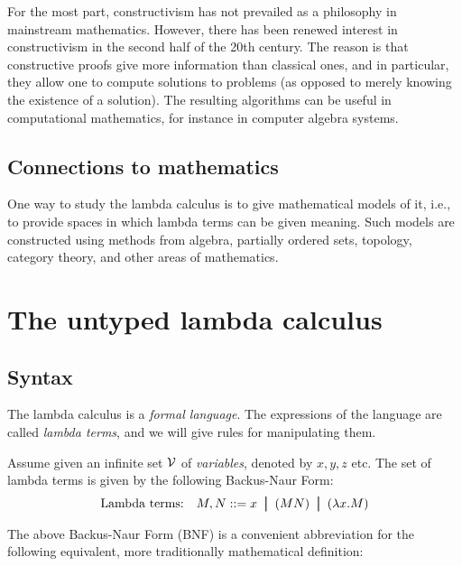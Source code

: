 \documentclass{article}
\begin{document}
For the most part, constructivism has not prevailed as a philosophy in
mainstream mathematics. However, there has been renewed interest in
constructivism in the second half of the 20th century. The reason is
that constructive proofs give more information than classical ones,
and in particular, they allow one to compute solutions to problems (as
opposed to merely knowing the existence of a solution). The resulting
algorithms can be useful in computational mathematics, for instance in
computer algebra systems.

\subsection{Connections to mathematics}

One way to study the lambda calculus is to give mathematical models of
it, i.e., to provide spaces in which lambda terms can be given
meaning.  Such models are constructed using methods from algebra,
partially ordered sets, topology, category theory, and other areas of
mathematics.

\section{The untyped lambda calculus}

\subsection{Syntax}

The lambda calculus is a {\em formal language}. The expressions of the
language are called {\em lambda terms}, and we will give rules for
manipulating them.

\begin{definition}
  Assume given an infinite set ${\cal V}$ of {\em variables}, denoted by
  $x,y,z$ etc. The set of lambda terms is given by the following
  Backus-Naur Form:
  \[  \mbox{Lambda terms:}\ssep M,N \bnf x \bor (MN) \bor (\lam x.M)
  \]
\end{definition}

The above Backus-Naur Form (BNF) is a convenient abbreviation for the
following equivalent, more traditionally mathematical definition:
\end{document}
